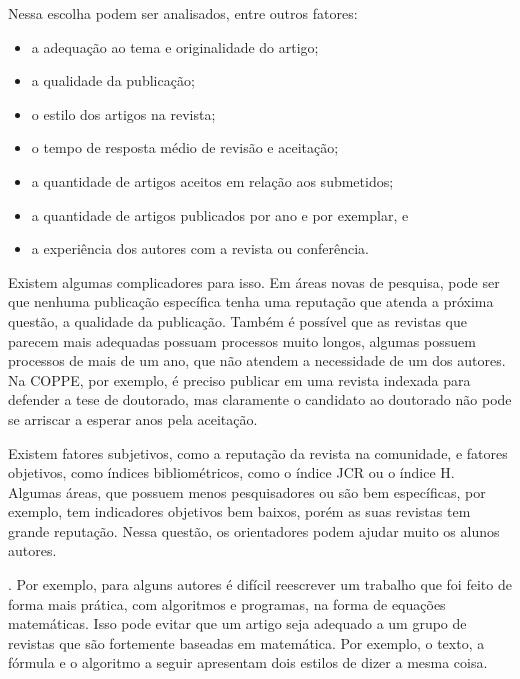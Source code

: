 \documentclass[openany]{book}
\begin{document}
Nessa escolha podem ser analisados, entre outros fatores:
\begin{itemize}
    \item a adequação ao tema e originalidade do artigo;
    \item a qualidade da publicação;
    \item o estilo dos artigos na revista;
    \item o tempo de resposta médio de revisão e aceitação;
    \item a quantidade de artigos aceitos em relação aos submetidos;
    \item a quantidade de artigos publicados por ano e por exemplar, e
    \item a experiência dos autores com a revista ou conferência.
\end{itemize}

 Existem algumas complicadores para isso. Em áreas novas de pesquisa, pode ser que nenhuma publicação específica tenha uma reputação que atenda a próxima questão, a qualidade da publicação. Também é possível que as revistas que parecem mais adequadas possuam processos muito longos, algumas possuem processos de mais de um ano, que não atendem a necessidade de um dos autores. Na COPPE, por exemplo, é preciso publicar em uma revista indexada para defender a tese de doutorado, mas claramente o candidato ao doutorado não pode se arriscar a esperar anos pela aceitação.

 Existem fatores subjetivos, como a reputação da revista na comunidade, e fatores objetivos, como índices bibliométricos, como o índice JCR ou o índice H. Algumas áreas, que possuem menos pesquisadores ou são bem específicas, por exemplo, tem indicadores objetivos bem baixos, porém as suas revistas tem grande reputação. Nessa questão, os orientadores podem ajudar muito os alunos autores.

. Por exemplo, para alguns autores é difícil reescrever um trabalho que foi feito de forma mais prática, com algoritmos e programas, na forma de equações matemáticas. Isso pode evitar que um artigo seja adequado a um grupo de revistas que são fortemente baseadas em matemática. Por exemplo, o texto, a fórmula e o algoritmo a seguir apresentam dois estilos de dizer  a mesma coisa.
\end{document}
